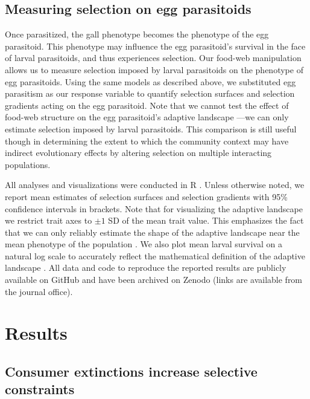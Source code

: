 \documentclass[11pt,]{article}
\begin{document}
\subsection{Measuring selection on egg
parasitoids}\label{measuring-selection-on-egg-parasitoids}

Once parasitized, the gall phenotype becomes the phenotype of the egg
parasitoid. This phenotype may influence the egg parasitoid's survival
in the face of larval parasitoids, and thus experiences selection. Our
food-web manipulation allows us to measure selection imposed by larval
parasitoids on the phenotype of egg parasitoids. Using the same models
as described above, we substituted egg parasitism as our response
variable to quantify selection surfaces and selection gradients acting
on the egg parasitoid. Note that we cannot test the effect of food-web
structure on the egg parasitoid's adaptive landscape ---we can only
estimate selection imposed by larval parasitoids. This comparison is
still useful though in determining the extent to which the community
context may have indirect evolutionary effects by altering selection on
multiple interacting populations.

All analyses and visualizations were conducted in R \citep{R2018}.
Unless otherwise noted, we report mean estimates of selection surfaces
and selection gradients with 95\% confidence intervals in brackets. Note
that for visualizing the adaptive landscape we restrict trait axes to
\(\pm 1\) SD of the mean trait value. This emphasizes the fact that we
can only reliably estimate the shape of the adaptive landscape near the
mean phenotype of the population \citep{Arnold2001}. We also plot mean
larval survival on a natural log scale to accurately reflect the
mathematical definition of the adaptive landscape \citep{Arnold2003}.
All data and code to reproduce the reported results are publicly
available on GitHub and have been archived on Zenodo (links are
available from the journal office).

\section{Results}\label{results}

\subsection{Consumer extinctions increase selective
constraints}\label{consumer-extinctions-increase-selective-constraints}
\end{document}
